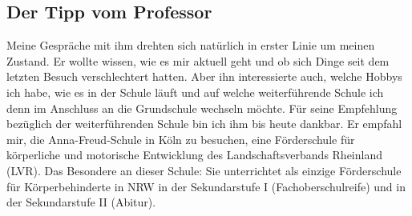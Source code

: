 \documentclass[fontsize=14pt,a4paper,headinclude,DIV=calc,automark]{scrbook}
\begin{document}
\subsection{Der Tipp vom Professor}

Meine Gespräche mit ihm drehten sich natürlich in erster Linie um meinen Zustand. Er wollte wissen, wie es mir aktuell geht und ob sich Dinge seit dem letzten Besuch verschlechtert hatten. Aber ihn interessierte auch, welche Hobbys ich habe, wie es in der Schule läuft und auf welche weiterführende Schule ich denn im Anschluss an die Grundschule wechseln möchte. Für seine Empfehlung bezüglich der weiterführenden Schule bin ich ihm bis heute dankbar. Er empfahl mir, die Anna-Freud-Schule in Köln zu besuchen, eine Förderschule für körperliche und motorische Entwicklung des Landschaftsverbands Rheinland (LVR). Das Besondere an dieser Schule: Sie unterrichtet als einzige Förderschule für Körperbehinderte in NRW in der Sekundarstufe I (Fachoberschulreife) und in der Sekundarstufe II (Abitur).
\end{document}
